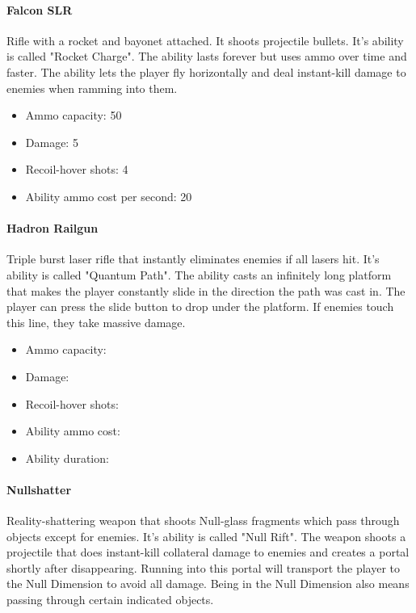\documentclass[12pt]{article}
\begin{document}
\paragraph{Falcon SLR}

Rifle with a rocket and bayonet attached. It shoots projectile bullets. It's ability is called "Rocket Charge". The ability lasts forever but uses ammo over time and faster. The ability lets the player fly horizontally and deal instant-kill damage to enemies when ramming into them.

\begin{itemize}
	\item Ammo capacity: 50
	\item Damage: 5
	\item Recoil-hover shots: 4
	\item Ability ammo cost per second: 20
\end{itemize} 


\paragraph{Hadron Railgun}

Triple burst laser rifle that instantly eliminates enemies if all lasers hit. It's ability is called "Quantum Path". The ability casts an infinitely long platform that makes the player constantly slide in the direction the path was cast in. The player can press the slide button to drop under the platform. If enemies touch this line, they take massive damage. 


\begin{itemize}
	\item Ammo capacity: 
	\item Damage: 
	\item Recoil-hover shots: 
	\item Ability ammo cost: 
	\item Ability duration: 
\end{itemize}


\paragraph{Nullshatter}

Reality-shattering weapon that shoots Null-glass fragments which pass through objects except for enemies. It's ability is called "Null Rift". The weapon shoots a projectile that does instant-kill collateral damage to enemies and creates a portal shortly after disappearing. Running into this portal will transport the player to the Null Dimension to avoid all damage. Being in the Null Dimension also means passing through certain indicated objects. 
\end{document}
